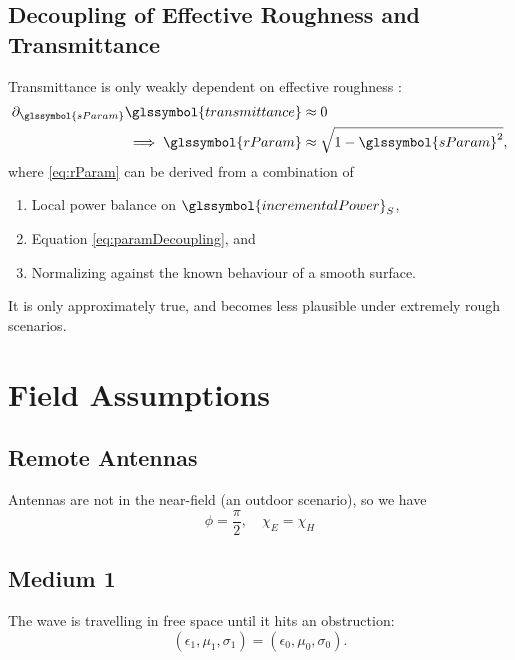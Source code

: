 \documentclass{article}
\begin{document}
\subsection{Decoupling of Effective Roughness and Transmittance}
Transmittance is only weakly dependent on effective roughness :
\begin{subequations}
\begin{align}
   \partial_{\glssymbol{sParam}} \glssymbol{transmittance} & \approx 0 \label{eq:paramDecoupling}
      \\
   \implies \glssymbol{rParam} & \approx \sqrt{ 1 - \glssymbol{sParam}^2 },
      \label{eq:rParam}
\end{align}
\end{subequations}
where \eqref{eq:rParam} can be derived from a combination of
\begin{enumerate}
   \item Local power balance on $\glssymbol{incrementalPower}_S$,
   \item Equation \eqref{eq:paramDecoupling}, and 
   \item Normalizing against the known behaviour of a smooth surface.
\end{enumerate}
It is only approximately true, and becomes less plausible under extremely rough
scenarios.

\setcounter{section}{5} %
\setcounter{subsection}{0}
\setcounter{equation}{0}
\section{Field Assumptions}
\subsection{Remote Antennas}
Antennas are not in the near-field (an outdoor scenario), so we have
\begin{equation}
   \phi = \frac{\pi}{2}, \quad \chi_E = \chi_H
   \label{eq:remoteAntennas}
\end{equation}
\subsection{Medium 1}
The wave is travelling in free space until it hits an obstruction:
\begin{equation}
   (\epsilon_1, \mu_1, \sigma_1) = (\epsilon_0, \mu_0, \sigma_0).
   \label{eq:medium1}
\end{equation}
\end{document}
